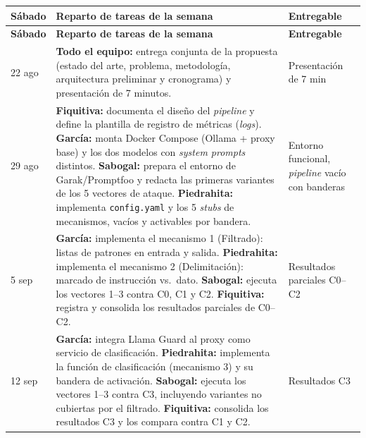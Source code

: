 \documentclass[11pt,letterpaper]{article}
\begin{document}
\begin{center}
\small
\begin{longtable}{@{}p{1.9cm}p{9.9cm}p{2.9cm}@{}}
\toprule
\textbf{Sábado} & \textbf{Reparto de tareas de la semana} & \textbf{Entregable} \\
\midrule
\endfirsthead
\toprule
\textbf{Sábado} & \textbf{Reparto de tareas de la semana} & \textbf{Entregable} \\
\midrule
\endhead
\bottomrule
\endfoot
\bottomrule
\endlastfoot

22 ago &
\textbf{Todo el equipo:} entrega conjunta de la propuesta (estado del arte, problema, metodología, arquitectura preliminar y cronograma) y presentación de 7 minutos. &
Presentación de 7 min \\[4pt]

29 ago &
\textbf{Fiquitiva:} documenta el diseño del \emph{pipeline} y define la plantilla de registro de métricas (\emph{logs}).\newline
\textbf{García:} monta Docker Compose (Ollama + proxy base) y los dos modelos con \emph{system prompts} distintos.\newline
\textbf{Sabogal:} prepara el entorno de Garak/Promptfoo y redacta las primeras variantes de los 5 vectores de ataque.\newline
\textbf{Piedrahita:} implementa \texttt{config.yaml} y los 5 \emph{stubs} de mecanismos, vacíos y activables por bandera. &
Entorno funcional, \emph{pipeline} vacío con banderas \\[4pt]

5 sep &
\textbf{García:} implementa el mecanismo 1 (Filtrado): listas de patrones en entrada y salida.\newline
\textbf{Piedrahita:} implementa el mecanismo 2 (Delimitación): marcado de instrucción vs.\ dato.\newline
\textbf{Sabogal:} ejecuta los vectores 1--3 contra C0, C1 y C2.\newline
\textbf{Fiquitiva:} registra y consolida los resultados parciales de C0--C2. &
Resultados parciales C0--C2 \\[4pt]

12 sep &
\textbf{García:} integra Llama Guard al proxy como servicio de clasificación.\newline
\textbf{Piedrahita:} implementa la función de clasificación (mecanismo 3) y su bandera de activación.\newline
\textbf{Sabogal:} ejecuta los vectores 1--3 contra C3, incluyendo variantes no cubiertas por el filtrado.\newline
\textbf{Fiquitiva:} consolida los resultados C3 y los compara contra C1 y C2. &
Resultados C3 \\[4pt]


\end{longtable}
\end{center}
\end{document}
